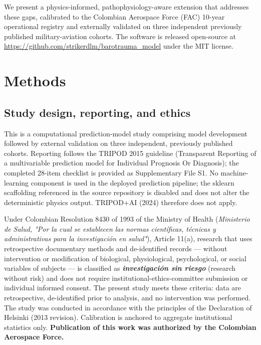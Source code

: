 \documentclass[11pt,a4paper]{article}
\begin{document}
We present a physics-informed, pathophysiology-aware extension that addresses these gaps, calibrated to the Colombian Aerospace Force (FAC) 10-year operational registry and externally validated on three independent previously published military-aviation cohorts. The software is released open-source at \url{https://github.com/strikerdlm/barotrauma_model} under the MIT license.



\section{Methods}

\subsection{Study design, reporting, and ethics}

This is a computational prediction-model study comprising model development followed by external validation on three independent, previously published cohorts. Reporting follows the TRIPOD 2015 guideline (Transparent Reporting of a multivariable prediction model for Individual Prognosis Or Diagnosis); the completed 28-item checklist is provided as Supplementary File S1. No machine-learning component is used in the deployed prediction pipeline; the sklearn scaffolding referenced in the source repository is disabled and does not alter the deterministic physics output. TRIPOD+AI (2024) therefore does not apply.

Under Colombian Resolution 8430 of 1993 of the Ministry of Health (\textit{Ministerio de Salud, "Por la cual se establecen las normas científicas, técnicas y administrativas para la investigación en salud"}), Article 11(a), research that uses retrospective documentary methods and de-identified records --- without intervention or modification of biological, physiological, psychological, or social variables of subjects --- is classified as \textbf{\textit{investigación sin riesgo}} (research without risk) and does not require institutional-ethics-committee submission or individual informed consent. The present study meets these criteria: data are retrospective, de-identified prior to analysis, and no intervention was performed. The study was conducted in accordance with the principles of the Declaration of Helsinki (2013 revision). Calibration is anchored to aggregate institutional statistics only. \textbf{Publication of this work was authorized by the Colombian Aerospace Force.}
\end{document}
